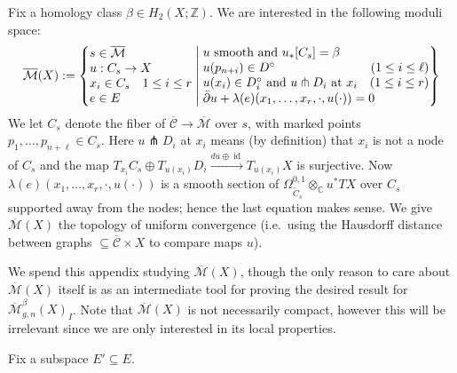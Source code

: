 \documentclass[12pt]{article}
\theoremstyle{definition}
\theoremstyle{remark}
\numberwithin{equation}{subsection}
\newcommand{\CC}{\mathbb C}
\newcommand{\ZZ}{\mathbb Z}
\newcommand{\Mbar}{\overline{\mathcal M}}
\newcommand{\Cbar}{\overline{\mathcal C}}
\newcommand{\delbar}{\bar\partial}
\newcommand{\id}{\operatorname{id}}
\begin{document}
Fix a homology class $\beta\in H_2(X;\ZZ)$.  We are interested in the following moduli space:
\begin{equation}\label{Mbarfirstdef}
\Mbar(X):=\left\{\begin{matrix}s\in\Mbar\hfill\cr u:C_s\to X\hfill\cr x_i\in C_s\quad 1\leq i\leq r\hfill\cr e\in E\hfill\end{matrix}\;\middle|\;\begin{matrix}u\text{ smooth and }u_\ast[C_s]=\beta\hfill\cr u(p_{n+i})\in D^\circ\quad\hfill(1\leq i\leq\ell)\cr u(x_i)\in D_i^\circ\text{ and }u\pitchfork D_i\text{ at }x_i\quad\hfill(1\leq i\leq r)\cr\delbar u+\lambda(e)(x_1,\ldots,x_r,\cdot,u(\cdot))=0\hfill\end{matrix}\right\}
\end{equation}
We let $C_s$ denote the fiber of $\Cbar\to\Mbar$ over $s$, with marked points $p_1,\ldots,p_{n+\ell}\in C_s$.  Here $u\pitchfork D_i$ at $x_i$ means (by definition) that $x_i$ is not a node of $C_s$ and the map $T_{x_i}C_s\oplus T_{u(x_i)}D_i\xrightarrow{du\oplus\id}T_{u(x_i)}X$ is surjective.  Now $\lambda(e)(x_1,\ldots,x_r,\cdot,u(\cdot))$ is a smooth section of $\Omega^{0,1}_{\tilde C_s}\otimes_\CC u^\ast TX$ over $C_s$ supported away from the nodes; hence the last equation makes sense.  We give $\Mbar(X)$ the topology of uniform convergence (i.e.\ using the Hausdorff distance between graphs $\subseteq\Cbar\times X$ to compare maps $u$).

We spend this appendix studying $\Mbar(X)$, though the only reason to care about $\Mbar(X)$ itself is as an intermediate tool for proving the desired result for $\Mbar^\beta_{g,n}(X)_I$.  Note that $\Mbar(X)$ is not necessarily compact, however this will be irrelevant since we are only interested in its local properties.

Fix a subspace $E'\subseteq E$.
\end{document}

